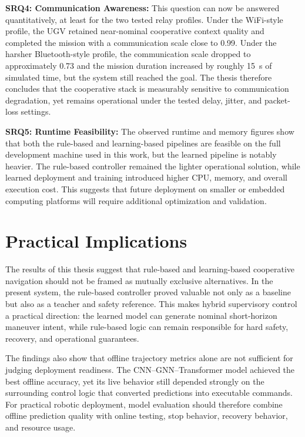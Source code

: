 \textbf{SRQ4: Communication Awareness:} This question can now be answered quantitatively, at least for the two tested relay profiles. Under the WiFi-style profile, the UGV retained near-nominal cooperative context quality and completed the mission with a communication scale close to 0.99. Under the harsher Bluetooth-style profile, the communication scale dropped to approximately 0.73 and the mission duration increased by roughly 15~s of simulated time, but the system still reached the goal. The thesis therefore concludes that the cooperative stack is measurably sensitive to communication degradation, yet remains operational under the tested delay, jitter, and packet-loss settings.

\medskip

\textbf{SRQ5: Runtime Feasibility:} The observed runtime and memory figures show that both the rule-based and learning-based pipelines are feasible on the full development machine used in this work, but the learned pipeline is notably heavier. The rule-based controller remained the lighter operational solution, while learned deployment and training introduced higher CPU, memory, and overall execution cost. This suggests that future deployment on smaller or embedded computing platforms will require additional optimization and validation.

\section{Practical Implications}
The results of this thesis suggest that rule-based and learning-based cooperative navigation should not be framed as mutually exclusive alternatives. In the present system, the rule-based controller proved valuable not only as a baseline but also as a teacher and safety reference. This makes hybrid supervisory control a practical direction: the learned model can generate nominal short-horizon maneuver intent, while rule-based logic can remain responsible for hard safety, recovery, and operational guarantees.

The findings also show that offline trajectory metrics alone are not sufficient for judging deployment readiness. The CNN--GNN--Transformer model achieved the best offline accuracy, yet its live behavior still depended strongly on the surrounding control logic that converted predictions into executable commands. For practical robotic deployment, model evaluation should therefore combine offline prediction quality with online testing, stop behavior, recovery behavior, and resource usage.

